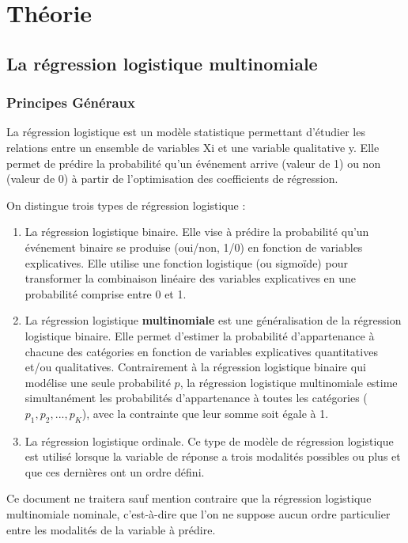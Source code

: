 \documentclass[10pt,french]{report}
\begin{document}
	\chapter{Théorie}

	\section{La régression logistique multinomiale}
	\subsection{Principes Généraux}
	La régression logistique est un modèle statistique permettant d'étudier les relations entre un ensemble de variables Xi et une variable qualitative y. Elle permet de prédire la probabilité qu'un événement arrive (valeur de 1) ou non (valeur de 0) à partir de l'optimisation des coefficients de régression.
	
	On distingue trois types de régression logistique :
	\begin{enumerate}
		\item La régression logistique binaire. Elle vise à prédire la probabilité qu'un événement binaire se produise (oui/non, 1/0) en fonction de variables explicatives. Elle utilise une fonction logistique (ou sigmoïde) pour transformer la combinaison linéaire des variables explicatives en une probabilité comprise entre 0 et 1.
		\item La régression logistique \textbf{multinomiale} est une généralisation de la régression logistique binaire. Elle permet d'estimer la probabilité d'appartenance à chacune des catégories en fonction de variables explicatives quantitatives et/ou qualitatives. Contrairement à la régression logistique binaire qui modélise une seule probabilité $p$, la régression logistique multinomiale estime simultanément les probabilités d'appartenance à toutes les catégories ($p_1, p_2, ..., p_K$), avec la contrainte que leur somme soit égale à 1.
		\item La régression logistique ordinale. Ce type de modèle de régression logistique est utilisé lorsque la variable de réponse a trois modalités possibles ou plus et que ces dernières ont un ordre défini.
	\end{enumerate}
	
	Ce document ne traitera sauf mention contraire que la régression logistique multinomiale nominale, c'est-à-dire que l'on ne suppose aucun ordre particulier entre les modalités de la variable à prédire.
\end{document}
